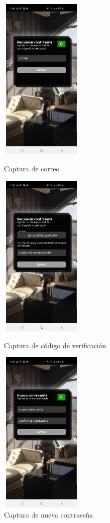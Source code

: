 \begin{figure}[h!]
	\begin{minipage}{0.32\textwidth}
		\centering
		\includegraphics[width=4cm,height=8cm]{imagenes/desarrollo/app/recover01.jpg}
		\caption{Captura de correo}
		\label{fig:rec02}
	\end{minipage}\hfill
	\begin{minipage}{0.32\textwidth}
		\centering
		\includegraphics[width=4cm,height=8cm]{imagenes/desarrollo/app/recover02.jpg}
		\caption{Captura de código de verificación}
		\label{fig:rec01}
	\end{minipage}\hfill
	\begin{minipage}{0.32\textwidth}
		\centering
		\includegraphics[width=4cm,height=8cm]{imagenes/desarrollo/app/recover03.jpg}
		\caption{Captura de nueva contraseña}
		\label{fig:rec03}
	\end{minipage}\hfill
\end{figure}

\clearpage
